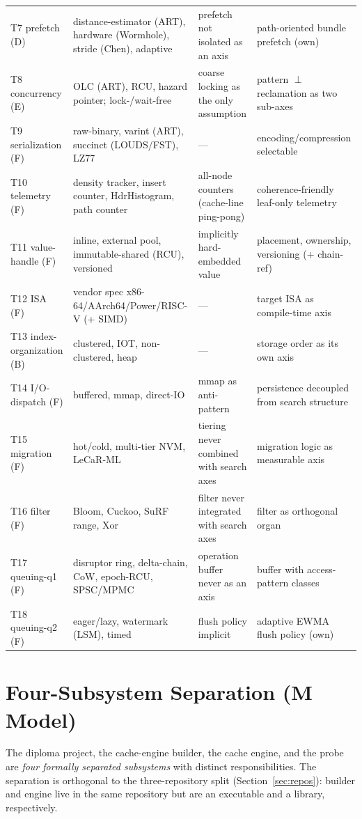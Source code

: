 {\begin{longtable}{@{}p{2.3cm}p{3.7cm}p{2.7cm}p{3.6cm}@{}}
T7 prefetch (D) & distance-estimator (ART), hardware (Wormhole), stride (Chen), adaptive & prefetch not isolated as an axis & path-oriented bundle prefetch (own) \\
T8 concurrency (E) & OLC (ART), RCU, hazard pointer; lock-/wait-free & coarse locking as the only assumption & pattern $\perp$ reclamation as two sub-axes \\
T9 serialization (F) & raw-binary, varint (ART), succinct (LOUDS/FST), LZ77 & --- & encoding/compression selectable \\
T10 telemetry (F) & density tracker, insert counter, HdrHistogram, path counter & all-node counters (cache-line ping-pong) & coherence-friendly leaf-only telemetry \\
T11 value-handle (F) & inline, external pool, immutable-shared (RCU), versioned & implicitly hard-embedded value & placement, ownership, versioning (+ chain-ref) \\
T12 ISA (F) & vendor spec x86-64/AArch64/Power/RISC-V (+ SIMD) & --- & target ISA as compile-time axis \\
T13 index-organization (B) & clustered, IOT, non-clustered, heap & --- & storage order as its own axis \\
T14 I/O-dispatch (F) & buffered, mmap, direct-IO & mmap as anti-pattern & persistence decoupled from search structure \\
T15 migration (F) & hot/cold, multi-tier NVM, LeCaR-ML & tiering never combined with search axes & migration logic as measurable axis \\
T16 filter (F) & Bloom, Cuckoo, SuRF range, Xor & filter never integrated with search axes & filter as orthogonal organ \\
T17 queuing-q1 (F) & disruptor ring, delta-chain, CoW, epoch-RCU, SPSC/MPMC & operation buffer never as an axis & buffer with access-pattern classes \\
T18 queuing-q2 (F) & eager/lazy, watermark (LSM), timed & flush policy implicit & adaptive EWMA flush policy (own) \\
\end{longtable}
}

\section{Four-Subsystem Separation (M Model)}\label{sec:m-model}

The diploma project, the cache-engine builder, the cache engine, and the probe are
\emph{four formally separated subsystems} with distinct responsibilities. The separation is
orthogonal to the three-repository split (Section~\ref{sec:repos}): builder and engine live in the
same repository but are an executable and a library, respectively.

